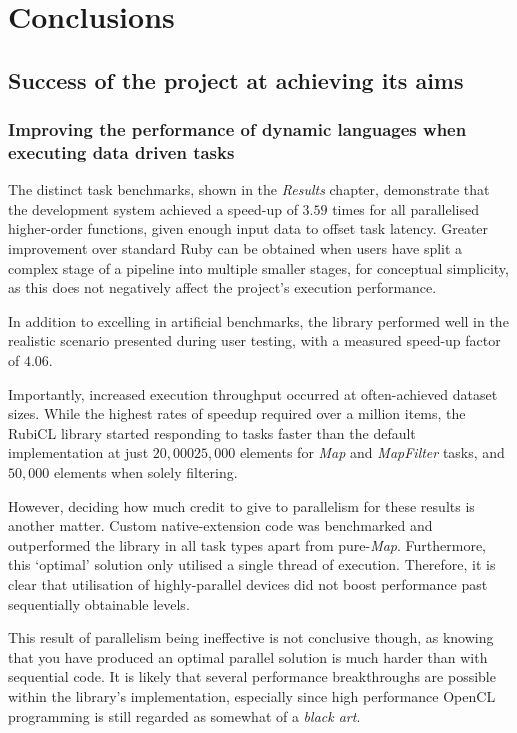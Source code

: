 \chapter{Conclusions}
\section{Success of the project at achieving its aims}
\subsection{Improving the performance of dynamic languages when executing data driven tasks}
The distinct task benchmarks, shown in the \emph{Results} chapter, demonstrate that the development system achieved a speed-up of $3.5$\textendash$9$ times for all parallelised higher-order functions, given enough input data to offset task latency.
Greater improvement over standard Ruby can be obtained when users have split a complex stage of a pipeline into multiple smaller stages, for conceptual simplicity, as this does not negatively affect the project's execution performance.

In addition to excelling in artificial benchmarks, the library performed well in the realistic scenario presented during user testing, with a measured speed-up factor of $4.06$.

Importantly, increased execution throughput occurred at often-achieved dataset sizes. While the highest rates of speedup required over a million items, the RubiCL library started responding to tasks faster than the default implementation at just $20,000$\textendash$25,000$ elements for \emph{Map} and \emph{MapFilter} tasks, and $50,000$ elements when solely filtering.

However, deciding how much credit to give to parallelism for these results is another matter. Custom native-extension code was benchmarked and outperformed the library in all task types apart from pure-\emph{Map}. Furthermore, this `optimal' solution only utilised a single thread of execution. Therefore, it is clear that utilisation of highly-parallel devices did not boost performance past sequentially obtainable levels.

This result of parallelism being ineffective is not conclusive though, as knowing that you have produced an optimal parallel solution is much harder than with sequential code. It is likely that several performance breakthroughs are possible within the library's implementation, especially since high performance \ac{OpenCL} programming is still regarded as somewhat of a \emph{black art}.

